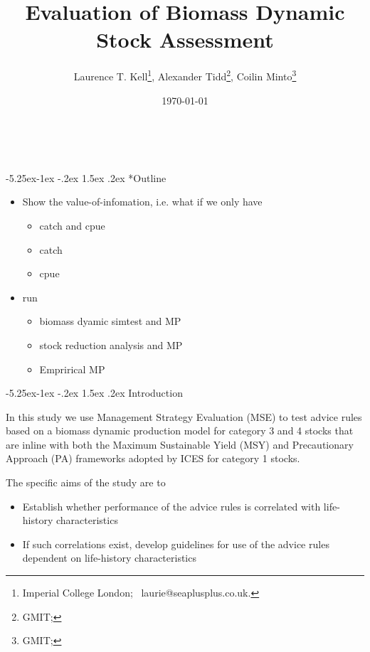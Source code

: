 \documentclass[a4paper, 10pt]{article}
\title{Evaluation of Biomass Dynamic Stock Assessment}
\author{Laurence T. Kell\footnote{Imperial College London; ~laurie@seaplusplus.co.uk.},
        Alexander Tidd\footnote{GMIT;},
        Coilin Minto\footnote{GMIT;}}
\date{\today}
\makeatletter
\renewcommand{\section}{\@startsection{section}{1}{\z@}%
 {-5.25ex\@plus -1ex \@minus -.2ex}%
 {1.5ex \@plus .2ex}%
 {\normalfont\bfseries}}
\makeatother
\begin{document}
\onehalfspacing
{}
\rhead{}

\maketitle
\thispagestyle{fancy}
\pagestyle{empty}


\tableofcontents\newpage\

\section*{Outline}

\begin{itemize}
\item Show the value-of-infomation, i.e. what if we only have 
\begin{itemize} 
\item catch and cpue
\item catch 
\item cpue
\end{itemize}
\item run
\begin{itemize} 
\item biomass dyamic simtest and MP 
\item stock reduction analysis and MP 
\item Emprirical MP 
\end{itemize}
\end{itemize}


\section{Introduction}

In this study we use Management Strategy Evaluation (MSE) to test advice rules based on a biomass dynamic production model for category 3 and 4 stocks that are inline with both the Maximum Sustainable Yield (MSY) and Precautionary Approach (PA) frameworks adopted by ICES for category 1 stocks. 

The specific aims of the study are to

  
\begin{itemize}
 \item Establish whether performance of the advice rules is correlated with life-history characteristics
 \item If such correlations exist, develop guidelines for use of the advice rules dependent on life-history characteristics
\end{itemize}
 
\end{document}
